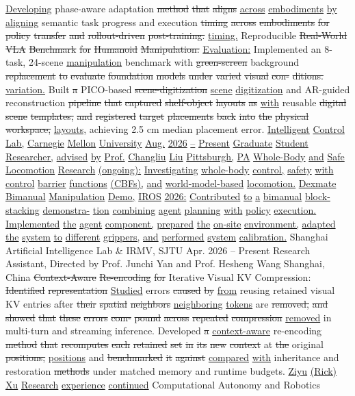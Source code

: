 \documentclass[10pt,letterpaper]{article}
\newcommand{\del}[1]{{\color{red}\sout{#1}}}
\newcommand{\add}[1]{{\color{blue}\uline{#1}}}
\begin{document}
\add{Developing} phase-aware adaptation \del{method} \del{that} \del{aligns} \add{across} \add{embodiments} \add{by} \add{aligning} semantic task progress and execution \del{timing} \del{across} \del{embodiments} \del{for} \del{policy} \del{transfer} \del{and} \del{rollout-driven} \del{post-training.} \add{timing.}  Reproducible \del{Real-World} \del{VLA} \del{Benchmark} \del{for} \del{Humanoid} \del{Manipulation:} \add{Evaluation:} Implemented an 8-task, 24-scene \add{manipulation} benchmark with \del{green-screen} background \del{replacement} \del{to} \del{evaluate} \del{foundation} \del{models} \del{under} \del{varied} \del{visual} \del{con-} \del{ditions.} \add{variation.} Built \del{a} PICO-based \del{scene-digitization} \add{scene} \add{digitization} and AR-guided reconstruction \del{pipeline} \del{that} \del{captured} \del{shelf-object} \del{layouts} \del{as} \add{with} reusable \del{digital} \del{scene} \del{templates,} \del{and} \del{registered} \del{target} \del{placements} \del{back} \del{into} \del{the} \del{physical} \del{workspace,} \add{layouts,} achieving 2.5 cm median placement error. \add{Intelligent} \add{Control} \add{Lab,} \add{Carnegie} \add{Mellon} \add{University} \add{Aug.} \add{2026} \add{--} \add{Present} \add{Graduate} \add{Student} \add{Researcher,} \add{advised} \add{by} \add{Prof.} \add{Changliu} \add{Liu} \add{Pittsburgh,} \add{PA} \add{} \add{Whole-Body} \add{and} \add{Safe} \add{Locomotion} \add{Research} \add{(ongoing):} \add{Investigating} \add{whole-body} \add{control,} \add{safety} \add{with} \add{control} \add{barrier} \add{functions} \add{(CBFs),} \add{and} \add{world-model-based} \add{locomotion.} \add{} \add{Dexmate} \add{Bimanual} \add{Manipulation} \add{Demo,} \add{IROS} \add{2026:} \add{Contributed} \add{to} \add{a} \add{bimanual} \add{block-stacking} \add{demonstra-} \add{tion} \add{combining} \add{agent} \add{planning} \add{with} \add{policy} \add{execution.} \add{Implemented} \add{the} \add{agent} \add{component,} \add{prepared} \add{the} \add{on-site} \add{environment,} \add{adapted} \add{the} \add{system} \add{to} \add{different} \add{grippers,} \add{and} \add{performed} \add{system} \add{calibration.} Shanghai Artificial Intelligence Lab \& IRMV, SJTU Apr. 2026 -- Present Research Assistant, Directed by Prof. Junchi Yan and Prof. Hesheng Wang Shanghai, China  \del{Context-Aware} \del{Re-encoding} \del{for} Iterative Visual KV Compression: \del{Identified} \del{representation} \add{Studied} errors \del{caused} \del{by} \add{from} reusing retained visual KV entries after \del{their} \del{spatial} \del{neighbors} \add{neighboring} \add{tokens} are \del{removed,} \del{and} \del{showed} \del{that} \del{these} \del{errors} \del{com-} \del{pound} \del{across} \del{repeated} \del{compression} \add{removed} in multi-turn and streaming inference. Developed \del{a} \add{context-aware} re-encoding \del{method} \del{that} \del{recomputes} \del{each} \del{retained} \del{set} \del{in} \del{its} \del{new} \del{context} at \del{the} original \del{positions,} \add{positions} and \del{benchmarked} \del{it} \del{against} \add{compared} \add{with} inheritance and restoration \del{methods} under matched memory and runtime budgets. \add{Ziyu} \add{(Rick)} \add{Xu} \add{Research} \add{experience} \add{continued} Computational Autonomy and Robotics 
\end{document}
